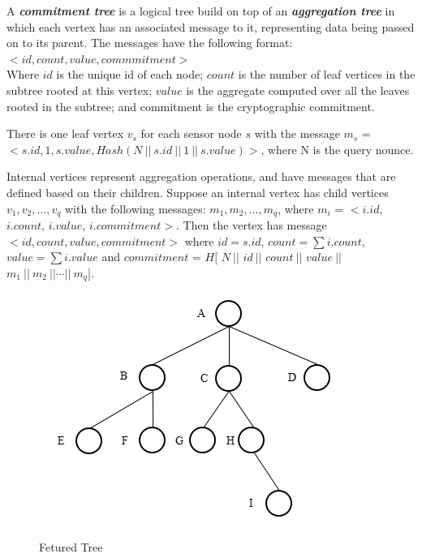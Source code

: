 	\begin{definition}\cite{chan2006secure}
		A \textbf{\textit{commitment tree}} is a logical tree build on top of an \textbf{\textit{aggregation tree}} in which each vertex has an associated message to it, representing data being passed on to its parent. The messages have the following format:\\

		$<id, count, value, commmitment>$\\
		\newline
		Where $id$ is the unique id of each node; $count$ is the number of leaf vertices in the subtree rooted at this vertex; $value$ is the aggregate computed over all the leaves rooted in the subtree; and commitment is the cryptographic commitment.

	\end{definition}

	There is one leaf vertex $v_{s}$ for each sensor node $s$ with the message $m_{s}$ = $< s.id, 1,s.value, Hash( N\ ||\  s.id\ ||\  1\  ||\  s.value) > $, where N is the query nounce.

	Internal vertices represent aggregation operations, and have messages that are defined based on their children. Suppose an internal vertex has child vertices $v_{1}, v_{2},\dotsc, v_{q}$ with the following messages: $m_{1}, m_{2},\dotsc, m_{q}$, where $m_{i}$ = $<i.id$, $i.count$, $i.value$, $i.commitment>$.
	Then the vertex has message $<id, count, value, commitment>$ where $id = s.id$, $count = \sum{i.count}$, $value = \sum{i.value}$ and $commitment$ = $H[$ $N\ || $ $id\ || $ $count\ || $ $value\ ||$ $m_{1}\ ||\ m_{2}\ || \dotsb ||\ m_{q}]$.


	\begin{figure}[hp]
		\centering
		\includegraphics[scale=0.5]{images/featured-tree.png}\\
		\caption{Fetured Tree}
	\end{figure}

